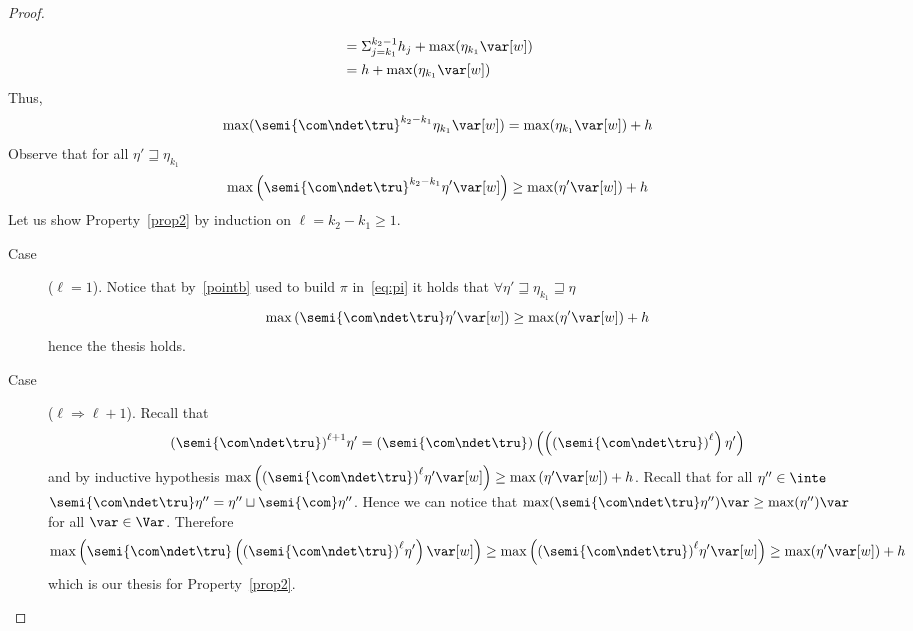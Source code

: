 \begin{proof}
\begin{inductive}
\begin{align*}
                               & = \Sigma_{j=k_1}^{k_2-1} h_j + \max(\eta_{k_1} \var[w])  \\
                               & = h +  \max(\eta_{k_1} \var[w])  
    \end{align*}
    Thus,
    \[\max(\semi{\com \ndet \tru}^{k_2-k_1} \eta_{k_1} \var[w]) = \max(\eta_{k_1}
      \var[w]) + h\] 
    Observe that for all \(\eta' \sqsupseteq \eta_{k_1}\)
    \begin{equation}\label{prop2}
      \max\left(\semi{\com \ndet \tru}^{k_2-k_1} \eta' \var[w]\right) \geq \max(\eta' \var[w]) + h
    \end{equation}
    Let us show Property~\eqref{prop2} by induction on \(\ell = k_2-k_1 \geq 1\).

    \begin{description}
    \item[Case] (\(\ell = 1\)).
    Notice that by~\ref{pointb} used to build \(\pi\)
    in~\eqref{eq:pi} it holds that
    \(\forall \eta'\sqsupseteq \eta_{k_1}\sqsupseteq \eta\)
    \begin{equation*}
      \max\left(\semi{\com\ndet\tru}\eta'\var[w]\right) \geq \max(\eta'\var[w]) + h
    \end{equation*}
    hence the thesis holds.

    \item[Case] (\(\ell \Rightarrow \ell + 1\)).
    Recall that
    \begin{equation*}
      {\left(\semi{\com\ndet\tru}\right)}^{\ell + 1}\eta' = {\left(\semi{\com\ndet\tru}\right)}\left(\left({\left(\semi{\com\ndet\tru}\right)}^\ell\right)\eta'\right)
    \end{equation*}
    and by inductive hypothesis
    \(\max\left({\left(\semi{\com\ndet\tru}\right)}^\ell\eta'\var[w]\right)
    \geq \max\left(\eta'\var[w]\right) + h\). Recall that for all
    \(\eta'' \in \inte\)
    \(\semi{\com\ndet \tru}\eta'' = \eta '' \sqcup \semi{\com}\eta''\).
    Hence we can notice that
    \(\max(\semi{\com\ndet\tru}\eta'')\var \geq \max(\eta'')\var\) for
    all \(\var \in \Var\). Therefore
    \begin{equation*}
      \max\left(\semi{\com\ndet\tru}\left({(\semi{\com\ndet\tru})}^\ell\eta'\right)\var[w]\right) \geq \max\left({(\semi{\com\ndet\tru})}^\ell\eta'\var[w]\right) \geq \max(\eta'\var[w]) + h
    \end{equation*}
    which is our thesis for Property~\eqref{prop2}.
    \end{description}
    

\end{inductive}
\end{proof}
